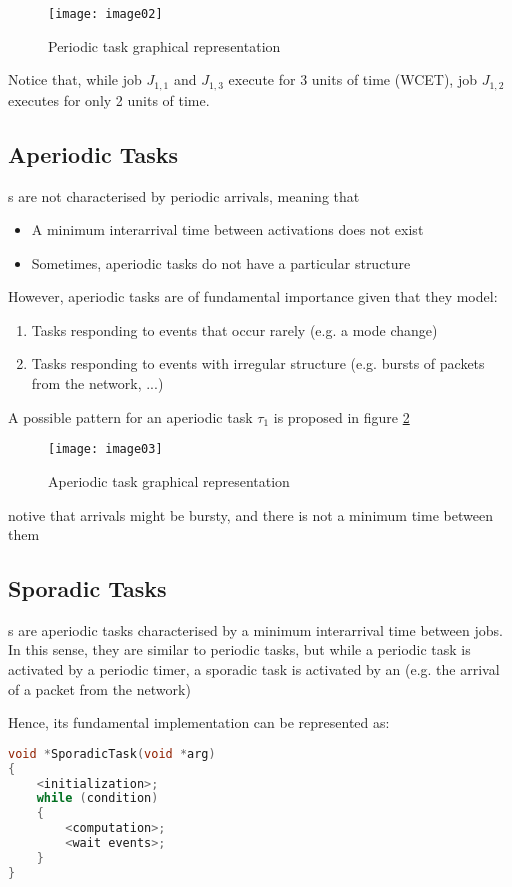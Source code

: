 \begin{figure}[!h]
\centering
\texttt{[image: image02]}
\caption{Periodic task graphical representation}
\label{fig:perta}
\end{figure}

Notice that, while job $J_{1,1}$ and $J_{1,3}$ execute for 3 units of time (WCET), job $J_{1,2}$ executes for only 2 units of time.

\subsection{Aperiodic Tasks}
s are not characterised by periodic arrivals, meaning that
\begin{itemize}
\item A minimum interarrival time between activations does not exist
\item Sometimes, aperiodic tasks do not have a particular structure
\end{itemize}
However, aperiodic tasks are of fundamental importance given that they model:
\begin{enumerate}
\item Tasks responding to events that occur rarely (e.g. a mode change)
\item Tasks responding to events with irregular structure (e.g. bursts of packets from the network, ...)
\end{enumerate}

A possible pattern for an aperiodic task $\tau_1$ is proposed in figure \ref{fig:aperta}

\begin{figure}[!h]
\centering
\texttt{[image: image03]}
\caption{Aperiodic task graphical representation}
\label{fig:aperta}
\end{figure}
notive that arrivals might be bursty, and there is not a minimum time between them

\subsection{Sporadic Tasks}
s are aperiodic tasks characterised by a minimum interarrival time between jobs. In this sense, they are similar to periodic tasks, but while a periodic task is activated by a periodic timer, a sporadic task is activated by an  (e.g. the arrival of a packet from the network)

Hence, its fundamental implementation can be represented as:
\begin{lstlisting}[language=C++]
void *SporadicTask(void *arg)
{
	<initialization>;
	while (condition)
	{
		<computation>;
		<wait events>;
	}
}
\end{lstlisting}

